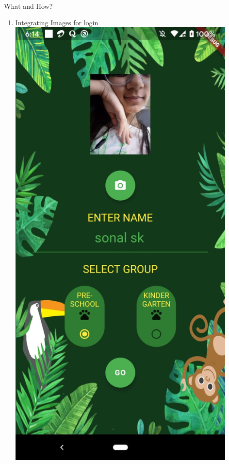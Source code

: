 \documentclass[14pt]{beamer}
\begin{document}
\begin{frame}{What and How?}
    \begin{enumerate}
        \item Integrating Images for login
            \includegraphics[width=0.9\textwidth]{Issue1}

\end{enumerate}
\end{frame}
\end{document}
